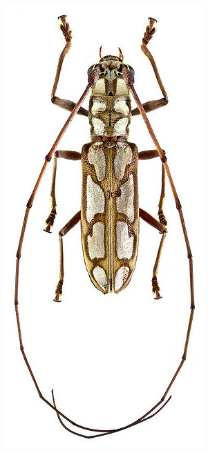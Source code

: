 \documentclass[letterpaper, 11pt]{article}
\begin{document}
\begin{figure}[ht!]
  \centering
\begin{subfigure}[ht!]{0.25\textwidth}
    \includegraphics[width=\textwidth]{Cerambycid1}

\end{subfigure}
\end{figure}
\end{document}
